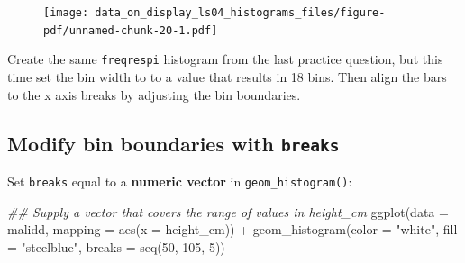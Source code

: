\documentclass[
  letterpaper,
  DIV=11,
  numbers=noendperiod]{scrreprt}
\newenvironment{Shaded}{\begin{snugshade}}{\end{snugshade}}
\newcommand{\AttributeTok}[1]{\textcolor[rgb]{0.40,0.45,0.13}{#1}}
\newcommand{\DecValTok}[1]{\textcolor[rgb]{0.68,0.00,0.00}{#1}}
\newcommand{\DocumentationTok}[1]{\textcolor[rgb]{0.37,0.37,0.37}{\textit{#1}}}
\newcommand{\FunctionTok}[1]{\textcolor[rgb]{0.28,0.35,0.67}{#1}}
\newcommand{\NormalTok}[1]{\textcolor[rgb]{0.00,0.23,0.31}{#1}}
\newcommand{\SpecialCharTok}[1]{\textcolor[rgb]{0.37,0.37,0.37}{#1}}
\newcommand{\StringTok}[1]{\textcolor[rgb]{0.13,0.47,0.30}{#1}}
\begin{document}
\begin{figure}[H]

{\centering \texttt{[image: data\_on\_display\_ls04\_histograms\_files/figure-pdf/unnamed-chunk-20-1.pdf]}

}

\end{figure}

\begin{tcolorbox}[enhanced jigsaw, colframe=quarto-callout-tip-color-frame, colbacktitle=quarto-callout-tip-color!10!white, titlerule=0mm, opacitybacktitle=0.6, breakable, toprule=.15mm, arc=.35mm, rightrule=.15mm, colback=white, bottomrule=.15mm, opacityback=0, toptitle=1mm, left=2mm, bottomtitle=1mm, title=\textcolor{quarto-callout-tip-color}{\faLightbulb}\hspace{0.5em}{Practice}, leftrule=.75mm, coltitle=black]

Create the same \texttt{freqrespi} histogram from the last practice
question, but this time set the bin width to to a value that results in
18 bins. Then align the bars to the x axis breaks by adjusting the bin
boundaries.

\end{tcolorbox}

\hypertarget{modify-bin-boundaries-with-breaks}{%
\subsection{\texorpdfstring{Modify bin boundaries with
\texttt{breaks}}{Modify bin boundaries with breaks}}\label{modify-bin-boundaries-with-breaks}}

Set \texttt{breaks} equal to a \textbf{numeric vector} in
\texttt{geom\_histogram()}:

\begin{Shaded}
\begin{Highlighting}[]
\DocumentationTok{\#\# Supply a vector that covers the range of values in height\_cm}
\FunctionTok{ggplot}\NormalTok{(}\AttributeTok{data =}\NormalTok{  malidd, }
       \AttributeTok{mapping =} \FunctionTok{aes}\NormalTok{(}\AttributeTok{x =}\NormalTok{ height\_cm)) }\SpecialCharTok{+}
  \FunctionTok{geom\_histogram}\NormalTok{(}\AttributeTok{color =} \StringTok{"white"}\NormalTok{, }
                 \AttributeTok{fill =} \StringTok{"steelblue"}\NormalTok{,}
                 \AttributeTok{breaks =} \FunctionTok{seq}\NormalTok{(}\DecValTok{50}\NormalTok{, }\DecValTok{105}\NormalTok{, }\DecValTok{5}\NormalTok{))}
\end{Highlighting}
\end{Shaded}
\end{document}
